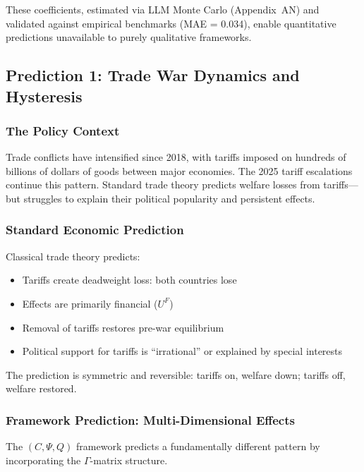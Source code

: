 These coefficients, estimated via LLM Monte Carlo (Appendix~AN) and validated 
against empirical benchmarks (MAE = 0.034), enable quantitative predictions 
unavailable to purely qualitative frameworks.

\subsection{Prediction 1: Trade War Dynamics and Hysteresis}
\label{subsec:pred-tradewar}

\subsubsection{The Policy Context}

Trade conflicts have intensified since 2018, with tariffs imposed on hundreds 
of billions of dollars of goods between major economies. The 2025 tariff 
escalations continue this pattern. Standard trade theory predicts welfare 
losses from tariffs---but struggles to explain their political popularity 
and persistent effects.

\subsubsection{Standard Economic Prediction}

Classical trade theory \citep{krugman1980} predicts:
\begin{itemize}
  \item Tariffs create deadweight loss: both countries lose
  \item Effects are primarily financial ($U^F$)
  \item Removal of tariffs restores pre-war equilibrium
  \item Political support for tariffs is ``irrational'' or explained by special interests
\end{itemize}

The prediction is symmetric and reversible: tariffs on, welfare down; tariffs off, welfare restored.

\subsubsection{Framework Prediction: Multi-Dimensional Effects}

The $(C, \Psi, Q)$ framework predicts a fundamentally different pattern 
by incorporating the $\Gamma$-matrix structure.

